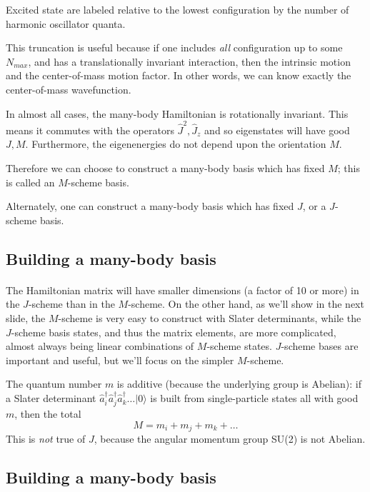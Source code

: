 \documentclass[%
oneside,                 %
final,                   %
10pt]{article}
\begin{document}
Excited state are labeled relative to the lowest configuration by the 
number of harmonic oscillator quanta.

This truncation is useful because if one includes \emph{all} configuration up to 
some $N_{max}$, and has a translationally invariant interaction, then the intrinsic 
motion and the center-of-mass motion factor. In other words, we can know exactly 
the center-of-mass wavefunction. 

In almost all cases, the many-body Hamiltonian is rotationally invariant. This means 
it commutes with the operators $\hat{J}^2, \hat{J}_z$ and so eigenstates will have 
good $J,M$. Furthermore, the eigenenergies do not depend upon the orientation $M$. 

Therefore we can choose to construct a many-body basis which has fixed $M$; this is 
called an $M$-scheme basis. 

Alternately, one can construct a many-body basis which has fixed $J$, or a $J$-scheme 
basis.



\subsection*{Building a many-body basis}

\paragraph{}
The Hamiltonian matrix will have smaller dimensions (a factor of 10 or more) in the $J$-scheme than in the $M$-scheme. 
On the other hand, as we'll show in the next slide, the $M$-scheme is very easy to 
construct with Slater determinants, while the $J$-scheme basis states, and thus the 
matrix elements, are more complicated, almost always being linear combinations of 
$M$-scheme states. $J$-scheme bases are important and useful, but we'll focus on the 
simpler $M$-scheme.

The quantum number $m$ is additive (because the underlying group is Abelian): 
if a Slater determinant $\hat{a}_i^\dagger \hat{a}^\dagger_j \hat{a}^\dagger_k \ldots | 0 \rangle$ 
is built from single-particle states all with good $m$, then the total 
\[
M = m_i + m_j + m_k + \ldots
\]
This is \emph{not} true of $J$, because the angular momentum group SU(2) is not Abelian.



\subsection*{Building a many-body basis}
\end{document}
